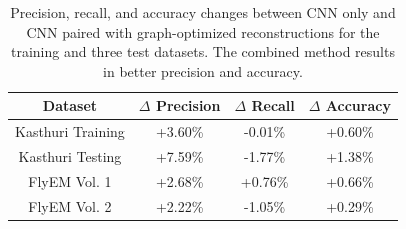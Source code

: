 \begin{table}[h]
	\centering
	\begin{tabular}{c c c c} \hline
		\textbf{Dataset} & $\Delta$ \textbf{Precision} & $\Delta$ \textbf{Recall} & $\Delta$ \textbf{Accuracy} \\ \hline
		Kasthuri Training & +3.60\% & -0.01\% & +0.60\% \\
		Kasthuri Testing & +7.59\% & -1.77\% & +1.38\% \\
		FlyEM Vol. 1 & +2.68\% & +0.76\% & +0.66\% \\
		FlyEM Vol. 2 & +2.22\% & -1.05\% & +0.29\% \\ \hline
	\end{tabular}
	\caption{Precision, recall, and accuracy changes between CNN only and CNN paired with graph-optimized reconstructions for the training and three test datasets. The combined method results in better precision and accuracy.}
	\label{table:multicut}
\end{table}
